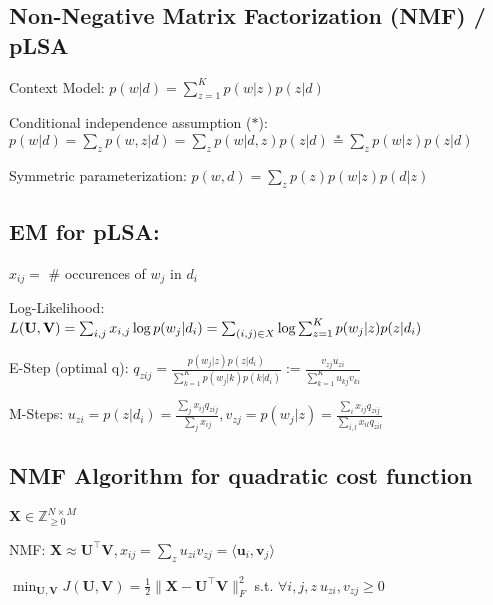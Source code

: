 \documentclass[a4paper, 11pt, landscape]{article}
\begin{document}
\begin{multicols*}{3}
\section{Non-Negative Matrix Factorization (NMF) / pLSA}
\begin{compactdesc}
	\item[Context Model:] $p(w | d) = \sum_{z=1}^K p(w | z) p(z | d)$
	\item[Conditional independence assumption ($*$):] $p(w|d) = \sum_z p(w,z|d) = \sum_z p(w|d,z)p(z|d) \stackrel{*}{=} \sum_z p(w|z)p(z|d)$
	\item[Symmetric parameterization:] $p(w, d) = \sum_z p(z)p(w | z) p(d | z)$
\end{compactdesc}

\subsection{EM for pLSA:}
$x_{ij} = $ \# occurences of $w_j$ in $d_i$
\begin{compactenum}
  \item Log-Likelihood: $L(\mathbf{U}, \mathbf{V}) = \sum_{i,j} x_{i,j}\log p(w_j|d_i) = \break \sum_{(i,j) \in X} \log \sum_{z=1}^K p(w_j|z)p(z|d_i)$
	\item E-Step (optimal q): $q_{zij} = \frac{p(w_j|z)p(z|d_i)}{\sum_{k=1}^K p(w_j|k)p(k|d_i)} := \frac{v_{zj}u_{zi}}{\sum_{k=1}^K u_{kj} v_{ki}}$
	\item M-Steps: $u_{zi} = p(z|d_i) = \frac{\sum_j x_{ij}q_{zij}}{\sum_j x_{ij}}, v_{zj} = p(w_j|z) = \frac{\sum_i x_{ij}q_{zij}}{\sum_{i,l}x_{il}q_{zil}}$
\end{compactenum}

\subsection{NMF Algorithm for quadratic cost function}
\begin{inparaitem}[\color{red}\textbullet]
	\item $\mathbf{X} \in \mathbb{Z}^{N \times M}_{\geq 0}$
	\item NMF: $\mathbf{X} \approx \mathbf{U^\top V}, x_{ij} = \sum_z u_{zi}v_{zj} = \langle \mathbf{u}_i, \mathbf{v}_j \rangle$
\end{inparaitem}

$ \min_{\mathbf{U}, \mathbf{V}} J(\mathbf{U}, \mathbf{V}) = \frac{1}{2} \|\mathbf{X} - \mathbf{U}^\top\mathbf{V}\|_F^2$ s.t. $\forall i,j,z~u_{zi},v_{zj} \geq 0 $


\end{multicols*}
\end{document}

